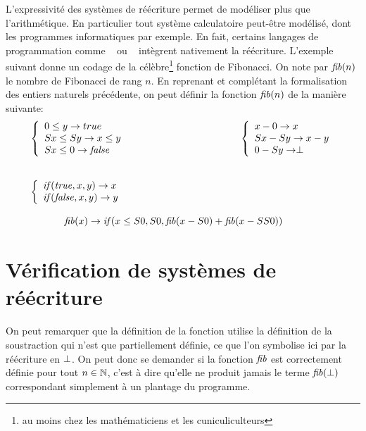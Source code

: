 L'expressivité des systèmes de réécriture permet de modéliser plus que l'arithmétique. 
En particulier tout système calculatoire peut-être modélisé, dont les programmes informatiques
par exemple. En fait, certains langages de programmation comme \ocaml~\cite{OCAML} ou \tom~\cite{TOM}
intègrent nativement la réécriture. L'exemple suivant donne un codage de la
célèbre\footnote{\footnotesize au moins chez les mathématiciens et les cuniculiculteurs} fonction de Fibonacci.
On note par $\mathit{fib}(n)$ le nombre de Fibonacci de rang $n$. En reprenant et complétant la formalisation des entiers
naturels précédente, on peut définir la fonction $\mathit{fib}(n)$ de la manière suivante:
\[
\begin{array}{l}
  \left\{\begin{array}{l}
      0 \le y \rw true\\
      Sx \le Sy \rw x \le y\\
      Sx \le 0 \rw \false
    \end{array}\right.
  \hspace*{4cm}
  \left\{\begin{array}{l}
      x - 0 \rw x\\
      Sx - Sy \rw x - y\\
      0 - Sy \rw \bottom
    \end{array}\right.\\
  \\\\
  \left\{\begin{array}{l}
      \ifte(\true, x, y) \rw x\\
      \ifte(\false,x, y) \rw y
    \end{array}\right.\\\\
  \hspace*{1.2cm}\fib(x) \rw \ifte(x\le S0, S0, \fib(x - S0) + \fib (x - SS0))
\end{array}
\]

\section{Vérification de systèmes de réécriture}

On peut remarquer que la définition de la fonction utilise la définition de la soustraction qui n'est que partiellement
définie, ce que l'on symbolise ici par la réécriture en $\perp$. On peut donc se demander si la fonction $\mathit{fib}$ 
est correctement définie pour tout $n \in \mathbb N$, c'est à dire qu'elle ne produit jamais le terme
$\mathit{fib}(\perp)$ correspondant simplement à un plantage du programme.

